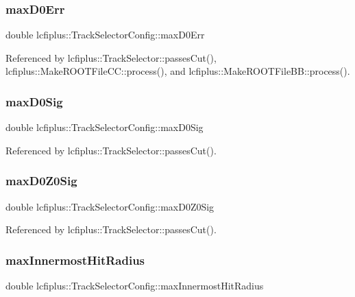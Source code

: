 \subsubsection{max\+D0\+Err}
{\footnotesize\ttfamily double lcfiplus\+::\+Track\+Selector\+Config\+::max\+D0\+Err}



Referenced by lcfiplus\+::\+Track\+Selector\+::passes\+Cut(), lcfiplus\+::\+Make\+R\+O\+O\+T\+File\+C\+C\+::process(), and lcfiplus\+::\+Make\+R\+O\+O\+T\+File\+B\+B\+::process().

\mbox{\label{classlcfiplus_1_1TrackSelectorConfig_abf9e6a132baea34e1be19fcbce57c5fb}} 
\subsubsection{max\+D0\+Sig}
{\footnotesize\ttfamily double lcfiplus\+::\+Track\+Selector\+Config\+::max\+D0\+Sig}



Referenced by lcfiplus\+::\+Track\+Selector\+::passes\+Cut().

\mbox{\label{classlcfiplus_1_1TrackSelectorConfig_a3452d2d9f391f92ea0fc57250943a297}} 
\subsubsection{max\+D0\+Z0\+Sig}
{\footnotesize\ttfamily double lcfiplus\+::\+Track\+Selector\+Config\+::max\+D0\+Z0\+Sig}



Referenced by lcfiplus\+::\+Track\+Selector\+::passes\+Cut().

\mbox{\label{classlcfiplus_1_1TrackSelectorConfig_a876e58b17222f546c9a78c66bff8cbab}} 
\subsubsection{max\+Innermost\+Hit\+Radius}
{\footnotesize\ttfamily double lcfiplus\+::\+Track\+Selector\+Config\+::max\+Innermost\+Hit\+Radius}



